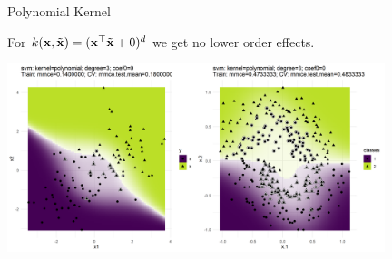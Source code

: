 \documentclass[11pt,compress,t,notes=noshow, xcolor=table]{beamer}
\begin{document}
\begin{vbframe}{Polynomial Kernel}
\framebreak 

For $k(\mathbf{x}, \tilde {\mathbf{x}}) = (\mathbf{x}^\top \tilde {\mathbf{x}} + 0)^d$ we get no lower order effects. 

\vspace*{0.1cm}
\begin{center}
\includegraphics[width = 11cm]{figure/svm_poly_kernel_deg_3_coef0_0.png}
\end{center}

\end{vbframe}


\endlecture
\end{document}
